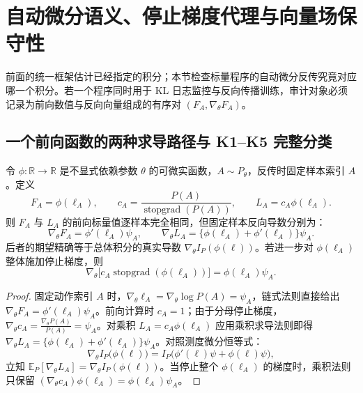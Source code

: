 \documentclass[lang=cn,scheme=chinese,openany]{elegantbook}
\newcommand{\E}{\mathbb E}
\newcommand{\sg}{\operatorname{stopgrad}}
\newcommand{\R}{\mathbb R}
\begin{document}
\section{自动微分语义、停止梯度代理与向量场保守性}
\label{est:sec:kl-autodiff}
\label{est:fields}

前面的统一框架估计已经指定的积分；本节检查标量程序的自动微分反传究竟对应哪一个积分。若一个程序同时用于 KL 日志监控与反向传播训练，审计对象必须记录为前向数值与反向向量组成的有序对 $(F_A, \nabla_\theta F_A)$。

\subsection{一个前向函数的两种求导路径与 K1--K5 完整分类}

\begin{theorem}[固定样本反传与采样测度补偿变换]
\label{est:thm:kl-autodiff-transform}
令 $\phi:\R\to\R$ 是不显式依赖参数 $\theta$ 的可微实函数，$A\sim P_\theta$，反传时固定样本索引 $A$。定义
\begin{equation*}
 F_A=\phi(\ell_A),\qquad
 c_A=\frac{P(A)}{\sg(P(A))},\qquad
 L_A=c_A\phi(\ell_A).
\end{equation*}
则 $F_A$ 与 $L_A$ 的前向标量值逐样本完全相同，但固定样本反向导数分别为：
\begin{equation*}
 \nabla_\theta F_A=\phi'(\ell_A)\psi_A,\qquad
 \nabla_\theta L_A=\bigl\{\phi(\ell_A)+\phi'(\ell_A)\bigr\}\psi_A.
\end{equation*}
后者的期望精确等于总体积分的真实导数 $\nabla_\theta I_P(\phi(\ell))$。若进一步对 $\phi(\ell_A)$ 整体施加停止梯度，则
\begin{equation*}
\nabla_\theta\bigl[c_A\sg(\phi(\ell_A))\bigr]=\phi(\ell_A)\psi_A.
\end{equation*}
\end{theorem}
\begin{proof}
固定动作索引 $A$ 时，$\nabla_\theta \ell_A=\nabla_\theta\log P(A)=\psi_A$，链式法则直接给出 $\nabla_\theta F_A=\phi'(\ell_A)\psi_A$。前向计算时 $c_A=1$；由于分母停止梯度，$\nabla_\theta c_A=\frac{\nabla_\theta P(A)}{P(A)}=\psi_A$。对乘积 $L_A=c_A\phi(\ell_A)$ 应用乘积求导法则即得 $\nabla_\theta L_A=\{\phi(\ell_A)+\phi'(\ell_A)\}\psi_A$。对照测度微分恒等式：
\begin{equation}
\nabla_\theta I_P\bigl(\phi(\ell)\bigr)
=I_P\bigl(\phi'(\ell)\psi+\phi(\ell)\psi\bigr),
\label{est:eq:kl-measure-derivative}
\end{equation}
立知 $\E_P[\nabla_\theta L_A]=\nabla_\theta I_P(\phi(\ell))$。当停止整个 $\phi(\ell_A)$ 的梯度时，乘积法则只保留 $(\nabla_\theta c_A)\phi(\ell_A)=\phi(\ell_A)\psi_A$。
\end{proof}
\end{document}

